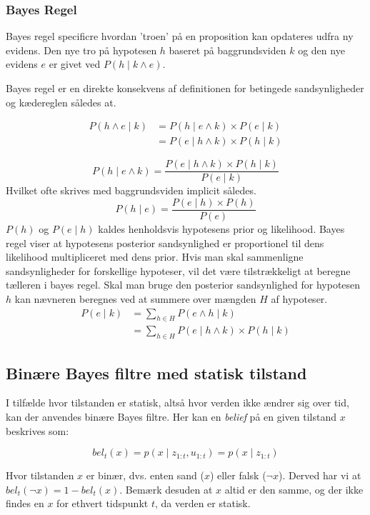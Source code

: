 \cite[s. 227]{ArtificialIntelligence}

\subsubsection{Bayes Regel}

Bayes regel specificre hvordan 'troen' på en proposition kan opdateres udfra ny evidens.
Den nye tro på hypotesen $h$ baseret på baggrundsviden $k$ og den nye evidens $e$ er givet ved $P(h \mid k \wedge e)$.

Bayes regel er en direkte konsekvens af definitionen for betingede sandsynligheder og kædereglen således at. 

\begin{align}
P(h \wedge e \mid k) &= P(h \mid e \wedge k) \times P(e \mid k) \\
&= P(e \mid h \wedge k) \times P(h \mid k)
\end{align}

$$P(h \mid e \wedge k) = \frac{P(e \mid h \wedge k) \times P(h \mid k)}{P(e \mid k)}$$
Hvilket ofte skrives med baggrundsviden implicit således.
$$P(h \mid e) = \frac{P(e \mid h) \times P(h)}{P(e)}$$
$P(h)$ og $P(e \mid h)$ kaldes henholdsvis hypotesens prior og likelihood.
Bayes regel viser at hypotesens posterior sandsynlighed er proportionel til dens likelihood multipliceret med dens prior.
Hvis man skal sammenligne sandsynligheder for forskellige hypoteser, vil det være tilstrækkeligt at beregne tælleren i bayes regel.
Skal man bruge den posterior sandsynlighed for hypotesen $h$ kan nævneren beregnes ved at summere over mængden $H$ af hypoteser.
\begin{align}
	P(e \mid k) &= \sum_{h \in H} P(e \wedge h \mid k) \\
	&= \sum_{h \in H}P(e \mid h \wedge k) \times P(h \mid k)
\end{align}
\cite[s. 229]{ArtificialIntelligence}

\subsection{Binære Bayes filtre med statisk tilstand}\label{bayes_binaerfiltre}
I tilfælde hvor tilstanden er statisk, altså hvor verden ikke ændrer sig over tid, kan der anvendes binære Bayes filtre.
Her kan en \textit{belief} på en given tilstand $x$ beskrives som:

$$bel_t(x) = p(x \mid z_{1:t},u_{1:t}) = p(x \mid z_{1:t})$$

Hvor tilstanden $x$ er binær, dvs. enten sand ($x$) eller falsk ($\lnot x$).
Derved har vi at $bel_t(\lnot x) = 1 - bel_t(x)$.
Bemærk desuden at $x$ altid er den samme, og der ikke findes en $x$ for ethvert tidspunkt $t$, da verden er statisk. \\ \\
\cite[s. 94]{probabilisticRobotics}

